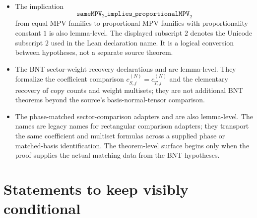 \documentclass{article}
\begin{document}
\begin{itemize}
    the equal-MPV proof. The former declaration
    \[
      \texttt{perBlock\_sameMPV\_of\_equalMPV\_CFBNT}
    \]
    extracting the blockwise equality conclusion from the common-block
    equal-MPV lemma has likewise been removed from the active Lean tree. These
    old names are retained here only to identify the retired one-copy route;
    neither should be counted as an
    additional source-level Fundamental Theorem.
  \item The implication
    \[
      \texttt{sameMPV}_{2}\texttt{\_implies\_proportionalMPV}_{2}
    \]
    from equal MPV families to proportional MPV families with proportionality
    constant $1$ is also lemma-level. The displayed subscript $2$ denotes
    the Unicode subscript $2$ used in the Lean declaration name. It is a
    logical conversion between hypotheses, not a separate source theorem.
  \item The BNT sector-weight recovery declarations
     and
    are lemma-level. They formalize the coefficient comparison
    $c_{S,j}^{(N)}=c_{T,j}^{(N)}$ and the elementary recovery of copy counts
    and weight multisets; they are not additional BNT theorems beyond the
    source's basis-normal-tensor comparison.
  \item The phase-matched sector-comparison adapters
    and
    are also lemma-level. The names are legacy names for rectangular comparison
    adapters; they transport the same coefficient and multiset formulas across a
    supplied phase or matched-basis identification. The theorem-level surface
    begins only when the proof supplies the actual matching data from the BNT
    hypotheses.
\end{itemize}

\section{Statements to keep visibly conditional}
\end{document}
